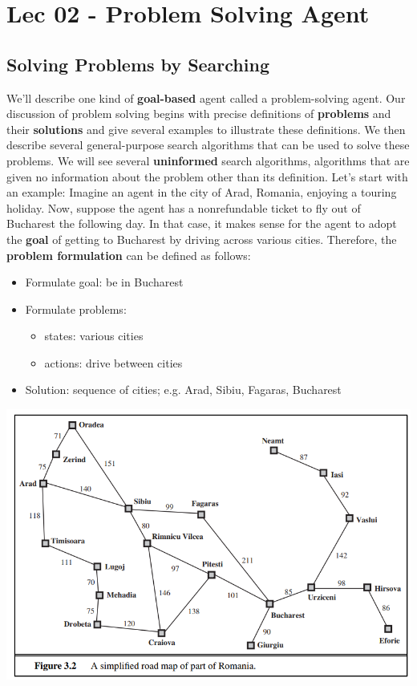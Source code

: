 \chapter{Lec 02 - Problem Solving Agent}
\section{Solving Problems by Searching}
We'll describe one kind of \textbf{goal-based} agent called a problem-solving agent. Our discussion of problem solving begins with precise definitions of \textbf{problems} and their \textbf{solutions} and give several examples to illustrate these definitions. We then describe several
general-purpose search algorithms that can be used to solve these problems. We will see several \textbf{uninformed} search algorithms, algorithms that are given no information about the problem other than its definition. Let's start with an example:\newline\newline
Imagine an agent in the city of Arad, Romania, enjoying a touring holiday. Now, suppose the agent has a nonrefundable ticket to fly out of Bucharest the following day. In that case, it makes sense for the agent to adopt the \textbf{goal} of getting to Bucharest by driving across various cities. Therefore, the \textbf{problem formulation} can be defined as follows:
\begin{itemize}
    \item Formulate goal: be in Bucharest
    \item Formulate problems:
    \begin{itemize}
        \item states: various cities
        \item actions: drive between cities
    \end{itemize}
    \item Solution: sequence of cities; e.g. Arad, Sibiu, Fagaras, Bucharest
\end{itemize}
\begin{center}
    \includegraphics[scale=0.8]{images/Romania.png}
\end{center}

